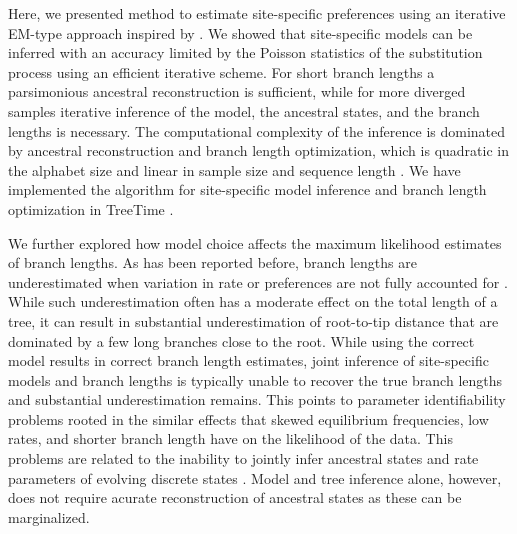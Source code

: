 \documentclass[aps,rmp,twocolumn,linenumbers]{revtex4-1}
\begin{document}
Here, we presented method to estimate site-specific preferences using an iterative EM-type approach inspired by \citet{bruno1996modeling}.
We showed that site-specific models can be inferred with an accuracy limited by the Poisson statistics of the substitution process using an efficient iterative scheme.
For short branch lengths a parsimonious ancestral reconstruction is sufficient, while for more diverged samples iterative inference of the model, the ancestral states, and the branch lengths is necessary.
The computational complexity of the inference is dominated by ancestral reconstruction and branch length optimization, which is quadratic in the alphabet size and linear in sample size and sequence length \citep{felsenstein2004inferring}.
We have implemented the algorithm for site-specific model inference and branch length optimization in TreeTime \citep{sagulenko2017treetime}.


We further explored how model choice affects the maximum likelihood estimates of branch lengths.
As has been reported before, branch lengths are underestimated when variation in rate or preferences are not fully accounted for \citep{halpern_evolutionary_1998,hilton_modeling_2018}.
While such underestimation often has a moderate effect on the total length of a tree, it can result in substantial underestimation of root-to-tip distance that are dominated by a few long branches close to the root.
While using the correct model results in correct branch length estimates, joint inference of site-specific models and branch lengths is typically unable to recover the true branch lengths and substantial underestimation remains.
This points to parameter identifiability problems rooted in the similar effects that skewed equilibrium frequencies, low rates, and shorter branch length have on the likelihood of the data.
This problems are related to the inability to jointly infer ancestral states and rate parameters of evolving discrete states \citep{gascuel_darwinian_2020}.
Model and tree inference alone, however, does not require acurate reconstruction of ancestral states as these can be marginalized.
\end{document}
